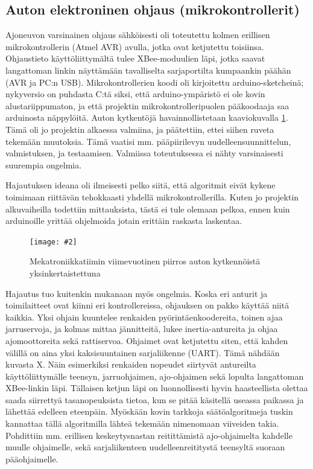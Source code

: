 \documentclass{article}
\newcommand{\kuvaa}[4]{%
	\begin{figure}[h]%
		\centering \texttt{[image: \#2]}%
		\caption{#3 \label{fig:#4}}%
	\end{figure}%
}
\begin{document}
\subsection{Auton elektroninen ohjaus (mikrokontrollerit)}

Ajoneuvon varsinainen ohjaus sähköisesti oli toteutettu kolmen erillisen mikrokontrollerin (Atmel AVR) avulla, jotka ovat ketjutettu toisiinsa. Ohjaustieto käyttöliittymältä tulee XBee-moduulien läpi, jotka saavat langattoman linkin näyttämään tavalliselta sarjaportilta kumpaankin päähän (AVR ja PC:n USB). Mikrokontrollerien koodi oli kirjoitettu arduino-sketcheinä; nykyversio on puhdasta C:tä siksi, että arduino-ympäristö ei ole kovin alustariippumaton, ja että projektin mikrokontrolleripuolen pääkoodaaja saa arduinosta näppylöitä. Auton kytkentöjä havainnollistetaan kaaviokuvalla \ref{fig:elektroniikka}. Tämä oli jo projektin alkaessa valmiina, ja päätettiin, ettei siihen ruveta tekemään muutoksia. Tämä vaatisi mm. pääpiirilevyn uudelleensuunnittelun, valmistuksen, ja testaamisen. Valmiissa toteutuksessa ei nähty varsinaisesti suurempia ongelmia.

Hajautuksen ideana oli ilmeisesti pelko siitä, että algoritmit eivät kykene toimimaan riittävän tehokkaasti yhdellä mikrokontrollerilla. Kuten jo projektin alkuvaiheilla todettiin mittauksista, tästä ei tule olemaan pelkoa, ennen kuin arduinoille yrittää ohjelmoida jotain erittäin raskasta laskentaa.

\kuvaa{0.9}{elektroniikka}{Mekatroniikkatiimin viimevuotinen piirros auton kytkennöistä yksinkertaistettuna}{elektroniikka}

Hajautus tuo kuitenkin mukanaan myös ongelmia. Koska eri anturit ja toimilaitteet ovat kiinni eri kontrollereissa, ohjauksen on pakko käyttää niitä kaikkia. Yksi ohjain kuuntelee renkaiden pyörintäenkoodereita, toinen ajaa jarruservoja, ja kolmas mittaa jännitteitä, lukee inertia-antureita ja ohjaa ajomoottoreita sekä rattiservoa. Ohjaimet ovat ketjutettu siten, että kahden välillä on aina yksi kaksisuuntainen sarjaliikenne (UART). Tämä nähdään kuvasta X. Näin esimerkiksi renkaiden nopeudet siirtyvät antureilta käyttöliittymälle teensyn, jarruohjaimen, ajo-ohjaimen sekä lopulta langattoman XBee-linkin läpi. Tällaisen ketjun läpi on luonnollisesti hyvin haasteellista olettaa saada siirrettyä tasanopeuksista tietoa, kun se pitää käsitellä useassa paikassa ja lähettää edelleen eteenpäin. Myöskään kovin tarkkoja säätöalgoritmeja tuskin kannattaa tällä algoritmilla lähteä tekemään nimenomaan viiveiden takia. Pohdittiin mm. erillisen keskeytysnastan reitittämistä ajo-ohjaimelta kahdelle muulle ohjaimelle, sekä sarjaliikenteen uudelleenreititystä teensyltä suoraan pääohjaimelle.
\end{document}
